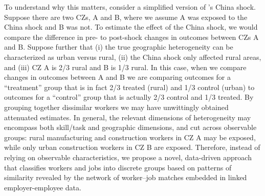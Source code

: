 \documentclass[12pt]{article}
\theoremstyle{definition}
\theoremstyle{plain}
\begin{document}
To understand why this matters, consider a simplified version of \citet{AutorDornHanson2013}'s China shock. Suppose there are two CZs, A and B, where we assume A was exposed to the China shock and B was not. To estimate the effect of the China shock, we would compare the difference in pre- to post-shock changes in outcomes between CZs A and B. Suppose further that (i) the true geographic heterogeneity can be characterized as urban versus rural, (ii) the China shock only affected rural areas, and (iii)  CZ A is 2/3 rural and B is 1/3 rural. In this case, when we compare changes in outcomes between A and B we are comparing outcomes for a ``treatment'' group that is in fact 2/3 treated (rural) and 1/3 control (urban) to outcomes for a ``control'' group that is actually 2/3 control and 1/3 treated. By grouping together dissimilar workers we may have unwittingly obtained attenuated estimates. In general, the relevant dimensions of heterogeneity may encompass both skill/task and geographic dimensions, and cut across observable groups: rural manufacturing and construction workers in CZ A may be exposed, while only urban construction workers in CZ B are exposed. Therefore, instead of relying on observable characteristics, we propose a novel, data-driven approach that classifies workers and jobs into discrete groups based on patterns of similarity revealed by the network of worker--job matches embedded in linked employer-employee data. 
\end{document}
